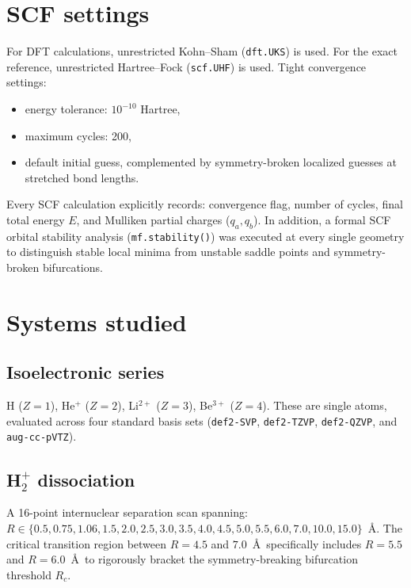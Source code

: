 \documentclass[11pt]{report}
\theoremstyle{definition}
\theoremstyle{remark}
\begin{document}
\section{SCF settings}

For DFT calculations, unrestricted Kohn--Sham (\texttt{dft.UKS}) is used.
For the exact reference, unrestricted Hartree--Fock (\texttt{scf.UHF}) is
used. Tight convergence settings:
\begin{itemize}
  \item energy tolerance: $10^{-10}$ Hartree,
  \item maximum cycles: 200,
  \item default initial guess, complemented by symmetry-broken localized guesses at stretched bond lengths.
\end{itemize}

Every SCF calculation explicitly records: convergence flag, number of cycles,
final total energy $E$, and Mulliken partial charges ($q_a, q_b$). In addition,
a formal SCF orbital stability analysis (\texttt{mf.stability()}) was executed
at every single geometry to distinguish stable local minima from unstable
saddle points and symmetry-broken bifurcations.

\section{Systems studied}

\subsection{Isoelectronic series}

H ($Z = 1$), He$^+$ ($Z = 2$), Li$^{2+}$ ($Z = 3$), Be$^{3+}$ ($Z = 4$).
These are single atoms, evaluated across four standard basis sets (\texttt{def2-SVP},
\texttt{def2-TZVP}, \texttt{def2-QZVP}, and \texttt{aug-cc-pVTZ}).

\subsection{H$_2^+$ dissociation}

A 16-point internuclear separation scan spanning:
$R \in \{0.5, 0.75, 1.06, 1.5, 2.0, 2.5, 3.0, 3.5, 4.0, 4.5, 5.0, 5.5, 6.0, 7.0,
10.0, 15.0\}$~\AA. The critical transition region between $R = 4.5$ and $7.0$~\AA\
specifically includes $R = 5.5$ and $R = 6.0$~\AA\ to rigorously bracket the
symmetry-breaking bifurcation threshold $R_c$.
\end{document}
